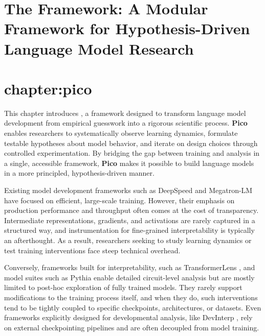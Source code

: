 \chapter[The \picomed Framework: A Modular Framework for Hypothesis-Driven Language Model Research]{The \picosupabig Framework: A Modular Framework for Hypothesis-Driven Language Model Research}
\chapter{chapter:pico}


This chapter introduces \pico, a framework designed to transform language model development from empirical guesswork into a rigorous scientific process. \textbf{Pico} enables researchers to systematically observe learning dynamics, formulate testable hypotheses about model behavior, and iterate on design choices through controlled experimentation. By bridging the gap between training and analysis in a single, accessible framework, \textbf{Pico} makes it possible to build language models in a more principled, hypothesis-driven manner. 

Existing model development frameworks such as DeepSpeed \citep{rasley2020deepspeed} and Megatron-LM \citep{narayanan2021megatron} have focused on efficient, large-scale training. However, their emphasis on production performance and throughput often comes at the cost of transparency. Intermediate representations, gradients, and activations are rarely captured in a structured way, and instrumentation for fine-grained interpretability is typically an afterthought. As a result, researchers seeking to study learning dynamics or test training interventions face steep technical overhead.

Conversely, frameworks built for interpretability, such as TransformerLens \citep{nanda2022transformerlens}, and model suites such as Pythia \citep{biderman2023pythia} enable detailed circuit-level analysis but are mostly limited to post-hoc exploration of fully trained models. They rarely support modifications to the training process itself, and when they do, such interventions tend to be tightly coupled to specific checkpoints, architectures, or datasets. Even frameworks explicitly designed for developmental analysis, like DevInterp \citep{devinterpcode}, rely on external checkpointing pipelines and are often decoupled from model training.

